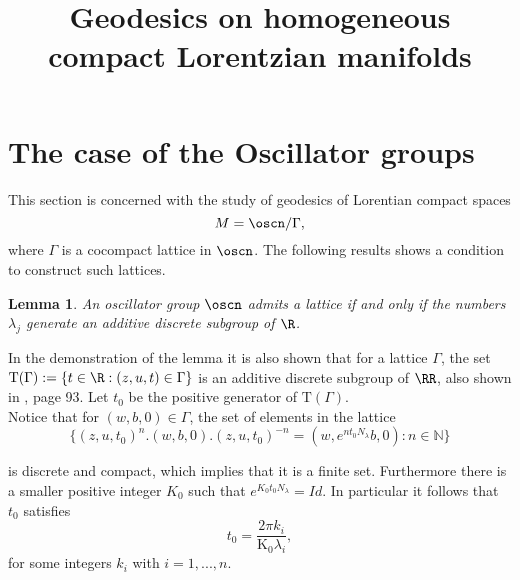 \documentclass[11pt]{amsart}
\theoremstyle{plain}
\newtheorem{lem}[thm]{Lemma}
\theoremstyle{definition}
\theoremstyle{remark}
\begin{document}
 	
 
\title[Geodesics on compact Lorentzian manifolds]{Geodesics on homogeneous compact Lorentzian manifolds}

\begin{abstract}
	
\end{abstract}

\author{}

\let\today\relax  %


\maketitle









\section{The case of the Oscillator groups}\label{sectionosc}

This section is concerned with the study of geodesics of Lorentian compact spaces  $$M=\oscn/ \Gamma,$$ where $\Gamma$ is a cocompact lattice in $\oscn$. The following results shows a condition to construct such lattices. 

\begin{lem}\cite{MeRe}\label{lema_medina}
	An oscillator group $\oscn$ admits a lattice if and only if the numbers $\lambda_j$ generate an additive discrete subgroup of $\R$.
\end{lem}

In the demonstration of the lemma it is also shown that for a lattice $\Gamma$, the set $\mathrm{T}(\Gamma):=\{ t \in \R : (z,u,t) \in \Gamma \}$ is an additive discrete subgroup of $\RR$, also shown in \cite{MF}, page 93. Let $t_0$ be the positive generator of $\mathrm{T}(\Gamma)$. \\

Notice that for $(w,b,0) \in \Gamma$, the set of elements in the lattice
\begin{equation*}
    \{ (z,u,t_0)^n.(w,b,0).(z,u,t_0)^{-n}=(w,e^{n t_0 N_{\lambda}}b,0) : n \in \mathbb{N} \}
\end{equation*}

is discrete and compact, which implies that it is a finite set. Furthermore there is a smaller positive integer $K_0$ such that $e^{K_0 t_0 N_{\lambda}} = Id$. In particular it follows that $t_0$ satisfies
\begin{equation} \label{oscilator-N}
t_0=\frac{2 \pi k_i}{\mathrm{K_0} \lambda_i},
\end{equation}
for some integers $k_i$ with $i=1, ..., n$.\\
\end{document}
